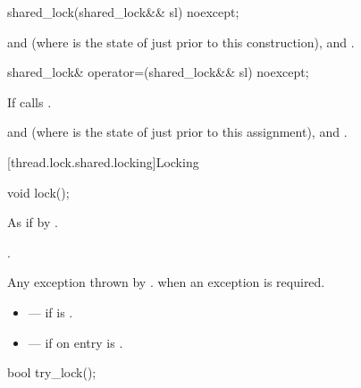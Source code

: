 %
\begin{itemdecl}
shared_lock(shared_lock&& sl) noexcept;
\end{itemdecl}

\begin{itemdescr}
\pnum
\ensures
{} and  (where
 is the state of  just prior to this construction),
 and .
\end{itemdescr}

%
\begin{itemdecl}
shared_lock& operator=(shared_lock&& sl) noexcept;
\end{itemdecl}

\begin{itemdescr}
\pnum
\effects
If  calls .

\pnum
\ensures
{} and  (where
 is the state of  just prior to this assignment),
 and .
\end{itemdescr}

[thread.lock.shared.locking]{Locking}

%
\begin{itemdecl}
void lock();
\end{itemdecl}

\begin{itemdescr}
\pnum
\effects
As if by .

\pnum
\ensures
{}.

\pnum
\throws
Any exception thrown by .
 when an exception is required.

\pnum
\errors
\begin{itemize}
\item {} --- if  is .
\item {} --- if on entry  is
.
\end{itemize}
\end{itemdescr}

%
\begin{itemdecl}
bool try_lock();
\end{itemdecl}

